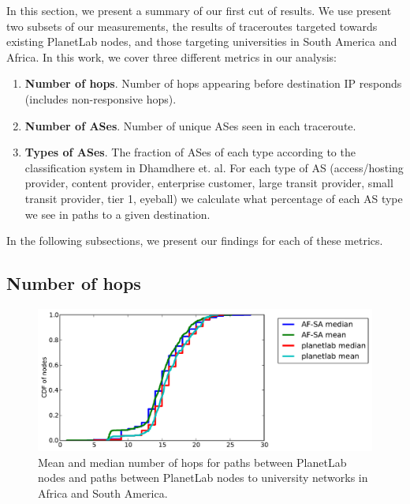 \documentclass{sig-alternate-10pt}
\begin{document}
In this section, we present a summary of our first cut of results. We use
present two subsets of our measurements, the results of traceroutes targeted
towards existing PlanetLab nodes, and those targeting universities in South
America and Africa. In this work, we cover three different metrics in our
analysis:

\begin{enumerate}

\item \textbf{Number of hops}. Number of hops appearing before destination IP
responds (includes non-responsive hops).

\item \textbf{Number of ASes}. Number of unique ASes seen in each traceroute.

\item \textbf{Types of ASes}. The fraction of ASes of each type according to
the classification system in Dhamdhere et. al.  For each type of AS
(access/hosting provider, content provider, enterprise customer, large transit
provider, small transit provider, tier 1, eyeball) we calculate what percentage
of each AS type we see in paths to a given destination.

\end{enumerate}

In the following subsections, we present our findings for each of these
metrics.

\subsection{Number of hops}

\begin{figure}
\centering
    \includegraphics[width=1.0\linewidth]{figs/number_of_hops.pdf}
    \caption{Mean and median number of hops for paths between PlanetLab nodes and 
paths between PlanetLab nodes to university networks in Africa and South America.}
    \label{fig:num_hops}
\end{figure}
\end{document}
